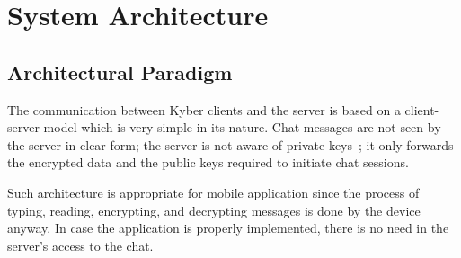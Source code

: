 \section{System Architecture}

\subsection{Architectural Paradigm}
The communication between Kyber clients and the server is based on a client-server model which is very simple in its nature. Chat messages are not seen by the server in clear form; the server is not aware of private keys~\cite{dolev_yao}; it only forwards the encrypted data and the public keys required to initiate chat sessions.

Such architecture is appropriate for mobile application since the process of typing, reading, encrypting, and decrypting messages is done by the device anyway. In case the application is properly implemented, there is no need in the server’s access to the chat.

